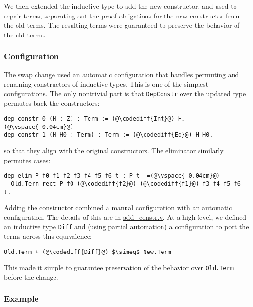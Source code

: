 We then extended the inductive type to add the new constructor, and used \toolname to repair terms,
separating out the proof obligations for the new constructor from the old terms.
The resulting terms were guaranteed to preserve the behavior of the old terms.

\subsubsection{Configuration}

The swap change used an automatic configuration that handles permuting and renaming constructors of inductive types.
This is one of the simplest configurations.
The only nontrivial part is that \lstinline{DepConstr} over the updated type permutes back the constructors:

\begin{lstlisting}[backgroundcolor=\color{cyan!30}]
dep_constr_0 (H : Z) : Term := (@\codediff{Int}@) H.(@\vspace{-0.04cm}@)
dep_constr_1 (H H0 : Term) : Term := (@\codediff{Eq}@) H H0.
\end{lstlisting}
so that they align with the original constructors.
The eliminator similarly permutes cases:

\begin{lstlisting}[backgroundcolor=\color{cyan!30}]
dep_elim P f0 f1 f2 f3 f4 f5 f6 t : P t :=(@\vspace{-0.04cm}@)
  Old.Term_rect P f0 (@\codediff{f2}@) (@\codediff{f1}@) f3 f4 f5 f6 t.
\end{lstlisting}

Adding the constructor combined a manual configuration with an automatic configuration.
The details of this are in \href{https://github.com/uwplse/pumpkin-pi/blob/v2.0.0/plugin/coq/playground/add_constr.v}{add_constr.v}.
At a high level, we defined an inductive type \lstinline{Diff} and (using partial automation) a configuration to port the terms across this equivalence:

\begin{lstlisting}
Old.Term + (@\codediff{Diff}@) $\simeq$ New.Term
\end{lstlisting}
This made it simple to guarantee preservation of the behavior over \lstinline{Old.Term} before the change.

\subsubsection{Example}

